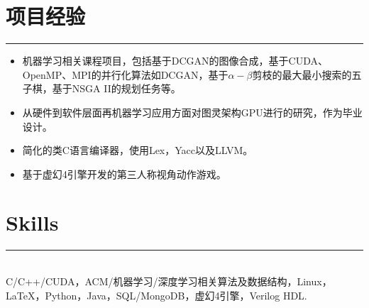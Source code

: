 \documentclass[a4paper]{article}
\begin{document}
		\section*{项目经验}
		\rule[1pt]{18cm}{0.01em}
		\begin{itemize}
		\item 机器学习相关课程项目，包括基于DCGAN的图像合成，基于CUDA、OpenMP、MPI的并行化算法如DCGAN，基于$ \alpha-\beta $剪枝的最大最小搜索的五子棋，基于NSGA II的规划任务等。
		\item 从硬件到软件层面再机器学习应用方面对图灵架构GPU进行的研究，作为毕业设计。
		\item 简化的类C语言编译器，使用Lex，Yacc以及LLVM。 
		\item 基于虚幻4引擎开发的第三人称视角动作游戏。
		\end{itemize}
		\section*{Skills}
		\rule[1pt]{18cm}{0.01em}\\
		C/C++/CUDA，ACM/机器学习/深度学习相关算法及数据结构，Linux，\LaTeX，Python，Java，SQL/MongoDB，虚幻4引擎，Verilog HDL.
		
	
\end{document}
